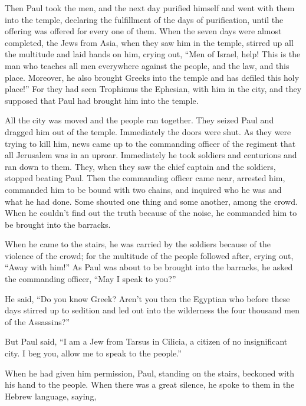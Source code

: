 Then Paul took the men, and the next day purified
himself and went with them into the temple, declaring the fulfillment of
the days of purification, until the offering was offered for every one
of them.  When the seven days were almost completed, the
Jews from Asia, when they saw him in the temple, stirred up all the
multitude and laid hands on him,  crying out, ``Men of
Israel, help! This is the man who teaches all men everywhere against the
people, and the law, and this place. Moreover, he also brought Greeks
into the temple and has defiled this holy place!''  For
they had seen Trophimus the Ephesian, with him in the city, and they
supposed that Paul had brought him into the temple.

 All the city was moved and the people ran together. They
seized Paul and dragged him out of the temple. Immediately the doors
were shut.  As they were trying to kill him, news came up
to the commanding officer of the regiment that all Jerusalem was in an
uproar.  Immediately he took soldiers and centurions and
ran down to them. They, when they saw the chief captain and the
soldiers, stopped beating Paul.  Then the commanding
officer came near, arrested him, commanded him to be bound with two
chains, and inquired who he was and what he had done. 
Some shouted one thing and some another, among the crowd. When he
couldn't find out the truth because of the noise, he commanded him to be
brought into the barracks.

 When he came to the stairs, he was carried by the
soldiers because of the violence of the crowd;  for the
multitude of the people followed after, crying out, ``Away with him!''
 As Paul was about to be brought into the barracks, he
asked the commanding officer, ``May I speak to you?''

He said, ``Do you know Greek?  Aren't you then the
Egyptian who before these days stirred up to sedition and led out into
the wilderness the four thousand men of the Assassins?''

 But Paul said, ``I am a Jew from Tarsus in Cilicia, a
citizen of no insignificant city. I beg you, allow me to speak to the
people.''

 When he had given him permission, Paul, standing on the
stairs, beckoned with his hand to the people. When there was a great
silence, he spoke to them in the Hebrew language, saying,

